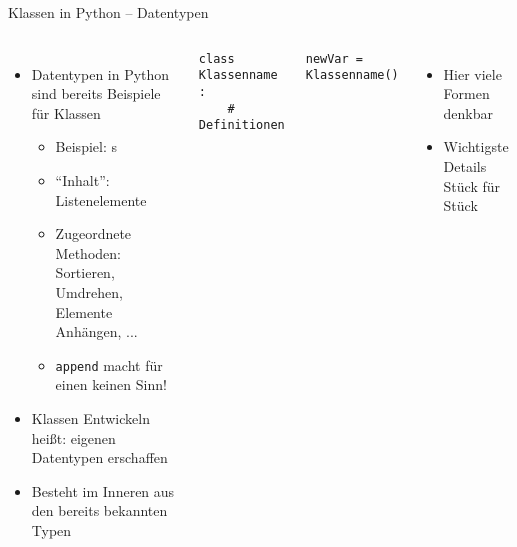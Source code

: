 \begin{frame}[fragile]{Klassen in Python -- Datentypen}
%
\begin{columns}[T]
\begin{itemize}
\item Datentypen in Python sind bereits Beispiele für Klassen
	\begin{itemize}
	\item Beispiel: s
	\item \enquote{Inhalt}: Listenelemente
	\item Zugeordnete Methoden: Sortieren, Umdrehen, Elemente Anhängen, ...
	\item \texttt{append} macht für einen  keinen Sinn!
	\end{itemize}
\item Klassen Entwickeln heißt: eigenen Datentypen erschaffen
\item Besteht im Inneren aus den bereits bekannten Typen
\end{itemize}
%
\begin{codebox}
\begin{verbatim}
class Klassenname :
    # Definitionen
\end{verbatim}
\end{codebox}

\begin{codebox}
\begin{verbatim}
newVar = Klassenname()
\end{verbatim}
\end{codebox}
\begin{itemize}
\item Hier viele Formen denkbar
\item Wichtigste Details Stück für Stück
\end{itemize}
\end{columns}
%
\end{frame}


